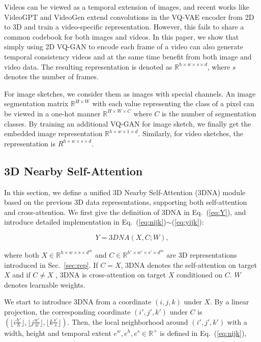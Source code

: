 Videos can be viewed as a temporal extension of images, and recent works like VideoGPT\cite{yanVideoGPTVideoGeneration2021} and VideoGen\cite{zhangVideoGenGenerativeModeling2020} extend convolutions in the VQ-VAE encoder from 2D to 3D and train a video-specific representation. However, this fails to share a common codebook for both images and videos. In this paper, we show that simply using 2D VQ-GAN to encode each frame of a video can also generate temporal consistency videos and at the same time benefit from both image and video data. The resulting representation is denoted as $\mathbb{R}^{h\times w\times s \times d}$, where $s$ denotes the number of frames.

For image sketches, we consider them as images with special channels. An image segmentation matrix $\mathbb{R}^{H\times W}$ with each value representing the class of a pixel can be viewed in a one-hot manner $\mathbb{R}^{H\times W\times C}$ where $C$ is the number of segmentation classes. By training an additional VQ-GAN for image sketch, we finally get the embedded image representation $\mathbb{R}^{h\times w\times 1\times d}$. Similarly, for video sketches, the representation is $R^{h\times w\times s\times d}$. 

\subsection{3D Nearby Self-Attention}\label{sec:nearby}

In this section, we define a unified 3D Nearby Self-Attention (3DNA) module based on the previous 3D data representations, supporting both self-attention and cross-attention. We first give the definition of 3DNA in Eq.~(\ref{eq:Y}), and introduce detailed implementation in Eq.~(\ref{eq:nijk})$\sim$(\ref{eq:yijk}):

\begin{equation} \label{eq:Y} 
Y=3DNA(X, C;W),
\end{equation}

where both $X \in \mathbb{R}^{h\times w\times s\times d^{in}}$ and $C\in \mathbb{R}^{h'\times w'\times s'\times d^{in}}$ are 3D representations introduced in Sec.~\ref{sec:rep}. If $C=X$, 3DNA denotes the self-attention on target $X$ and if $C\neq X$ , 3DNA is cross-attention on target $X$ conditioned on $C$. $W$ denotes learnable weights.

We start to introduce 3DNA from a coordinate $(i,j,k)$ under $X$. By a linear projection, the corresponding coordinate $(i',j',k')$ under $C$ is $\left(\lfloor i\frac{h'}{h}\rfloor, \lfloor j\frac{w'}{w}\rfloor, \lfloor k\frac{s'}{s}\rfloor\right)$. Then, the local neighborhood around $(i',j',k')$ with a width, height and temporal extent $e^w,e^h,e^s\in \mathbb{R}^+$ is defined in Eq.~(\ref{eq:nijk}),

